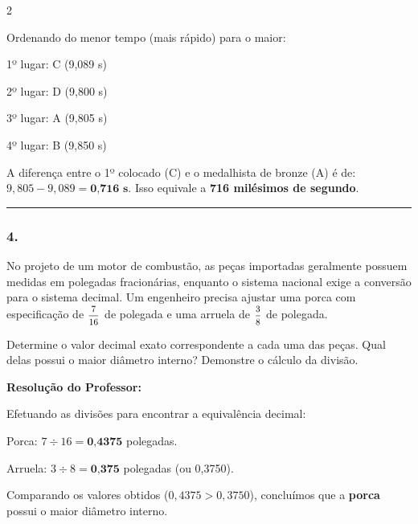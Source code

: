 \begin{multicols*}{2}
\begin{tcolorbox}[colback=CorTitUm!5, colframe=CorTitUm, boxrule=1pt, arc=4pt, left=6pt, right=6pt, top=6pt, bottom=6pt]
    Ordenando do menor tempo (mais rápido) para o maior:
    
    1º lugar: C (9,089 s)
    
    2º lugar: D (9,800 s)
    
    3º lugar: A (9,805 s)
    
    4º lugar: B (9,850 s)
    
    A diferença entre o 1º colocado (C) e o medalhista de bronze (A) é de: $9,805 - 9,089 = \textbf{0,716 s}$. Isso equivale a \textbf{716 milésimos de segundo}.
    \end{tcolorbox}
\fi

\par\vspace{\espacoQuestao}

\noindent\textcolor{CorLinha}{\rule{\linewidth}{0.5pt}} 
\par\vspace{\espacoPreQuestao}
\subsubsection*{4.} No projeto de um motor de combustão, as peças importadas geralmente possuem medidas em polegadas fracionárias, enquanto o sistema nacional exige a conversão para o sistema decimal. Um engenheiro precisa ajustar uma porca com especificação de $ \mfrac{7}{16} $ de polegada e uma arruela de $ \mfrac{3}{8} $ de polegada.

Determine o valor decimal exato correspondente a cada uma das peças. Qual delas possui o maior diâmetro interno? Demonstre o cálculo da divisão.

\ifgabarito
    \begin{tcolorbox}[colback=CorTitUm!5, colframe=CorTitUm, boxrule=1pt, arc=4pt, left=6pt, right=6pt, top=6pt, bottom=6pt]
    \small\textbf{\textcolor{CorTitUm}{Resolução do Professor:}}\par\vspace{0.1cm}
    \color{CinzaEscuro}
    Efetuando as divisões para encontrar a equivalência decimal:
    
    Porca: $7 \div 16 = \textbf{0,4375}$ polegadas.
    
    Arruela: $3 \div 8 = \textbf{0,375}$ polegadas (ou 0,3750).
    
    Comparando os valores obtidos ($0,4375 > 0,3750$), concluímos que a \textbf{porca} possui o maior diâmetro interno.
    \end{tcolorbox}
\fi


\end{multicols*}
